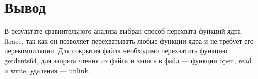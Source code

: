 \section{Вывод}

В результате сравнительного анализа выбран способ перехвата функций ядра — ftrace, так как он позволяет перехватывать любые функции ядра и не требует его перекомпиляции. Для сокрытия файла необходимо перехватить функцию getdents64, для запрета чтения из файла и запись в файл — функции open, read и write, удаления — unlink.

